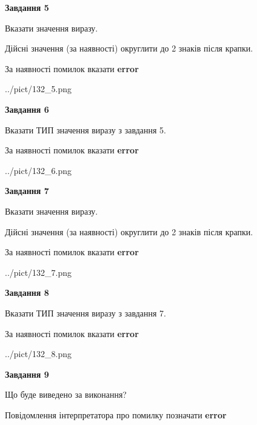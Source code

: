 \documentclass[11pt, ukrainian]{article}
\begin{document}
{\begin {large}
{\begin {center}\textbf{Завдання 5}\end {center}}\par
Вказати значення виразу. \par
Дійсні значення (за наявності) округлити до 2 знаків після крапки. \par
За наявності помилок вказати \textbf{error}

\begin{center}
	{../pict/132_5.png}
\end{center}
\newpage

{\begin {center}\textbf{Завдання 6}\end {center}}\par
Вказати ТИП значення виразу з завдання 5. \par
За наявності помилок вказати \textbf{error}

\begin{center}
	{../pict/132_6.png}
\end{center}
\newpage

{\begin {center}\textbf{Завдання 7}\end {center}}\par
Вказати значення виразу. \par
Дійсні значення (за наявності) округлити до 2 знаків після крапки. \par
За наявності помилок вказати \textbf{error}

\begin{center}
	{../pict/132_7.png}
\end{center}
\newpage

{\begin {center}\textbf{Завдання 8}\end {center}}\par
Вказати ТИП значення виразу з завдання 7. \par
За наявності помилок вказати \textbf{error}

\begin{center}
	{../pict/132_8.png}
\end{center}
\newpage

{\begin {center}\textbf{Завдання 9}\end {center}}\par
Що буде виведено за виконання? \par
Повідомлення інтерпретатора про помилку позначати \textbf{error}


\end{large}}
\end{document}
